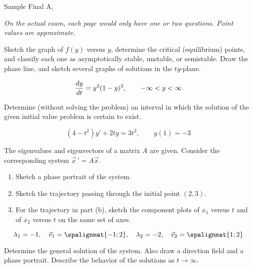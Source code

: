 \documentclass[12pt]{exam}
\newcommand{\TestName}{Sample Final A}
\begin{document}
    

\newpage
    
    \begin{center}
    {\Large \TestName, \Course}
    \end{center}
    

\textit{On the actual exam, each page would only have one or two questions. Point values are approximate.} 

\begin{questions}

    \question[10] %
    Sketch the graph of $f (y)$ versus $y$, determine the critical (equilibrium) points, and classify each one as asymptotically stable, unstable, or semistable. Draw the phase line, and sketch several graphs of solutions in the $ty$-plane.

    $${\frac{dy}{dt}} = y^2(1-y)^2, \qquad -\infty < y < \infty$$

    \question[2] %
    Determine (without solving the problem) an interval in which the solution of the given initial value problem is certain to exist. 
    
    $$(4-t^2)y'+2ty=3t^2, \qquad y(1) = -3$$


    
    \question[5] %
    The eigenvalues and eigenvectors of a matrix $A$ are given. Consider the corresponding system $\vec x \, ' = A \vec x$. 
    \begin{enumerate}[label=(\alph*)]
        \item Sketch a phase portrait of the system.
        \item Sketch the trajectory passing through the initial point $(2, 3)$.
        \item For the trajectory in part (b), sketch the component plots of $x_1$ versus $t$ and of $x_2$ versus $t$ on the same set of axes.
    \end{enumerate}

    $$\lambda_1 = -1, \quad \vec v_1 = \spalignmat{-1;2}, \quad \lambda_2 = -2, \quad \vec v_2 = \spalignmat{1;2}$$
    

    \question[10] %
    Determine the general solution of the system. Also draw a direction field and a phase portrait. Describe the behavior of the solutions as $t \to \infty$.
    

\end{questions}
\end{document}
